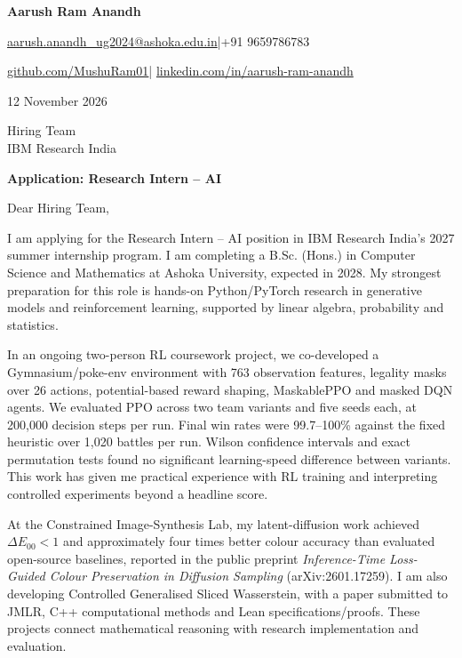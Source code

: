 \documentclass[11pt,a4paper]{article}
\begin{document}
{\LARGE\bfseries Aarush Ram Anandh}\par\vspace{4pt}
\href{mailto:aarush.anandh_ug2024@ashoka.edu.in}{aarush.anandh\_ug2024@ashoka.edu.in}\quad|\quad +91 9659786783\par\vspace{2pt}
\href{https://github.com/MushuRam01}{github.com/MushuRam01}\quad|\quad
\href{https://www.linkedin.com/in/aarush-ram-anandh/}{linkedin.com/in/aarush-ram-anandh}\par
\vspace{20pt}
12 November 2026\par\vspace{12pt}
Hiring Team\\
IBM Research India\par\vspace{12pt}
\textbf{Application: Research Intern -- AI}\par\vspace{14pt}
Dear Hiring Team,\par\vspace{10pt}
I am applying for the Research Intern -- AI position in IBM Research India's 2027 summer internship program. I am completing a B.Sc. (Hons.) in Computer Science and Mathematics at Ashoka University, expected in 2028. My strongest preparation for this role is hands-on Python/PyTorch research in generative models and reinforcement learning, supported by linear algebra, probability and statistics.\par\vspace{10pt}
In an ongoing two-person RL coursework project, we co-developed a Gymnasium/poke-env environment with 763 observation features, legality masks over 26 actions, potential-based reward shaping, MaskablePPO and masked DQN agents. We evaluated PPO across two team variants and five seeds each, at 200,000 decision steps per run. Final win rates were 99.7--100\% against the fixed heuristic over 1,020 battles per run. Wilson confidence intervals and exact permutation tests found no significant learning-speed difference between variants. This work has given me practical experience with RL training and interpreting controlled experiments beyond a headline score.\par\vspace{10pt}
At the Constrained Image-Synthesis Lab, my latent-diffusion work achieved $\Delta E_{00}<1$ and approximately four times better colour accuracy than evaluated open-source baselines, reported in the public preprint \textit{Inference-Time Loss-Guided Colour Preservation in Diffusion Sampling} (arXiv:2601.17259). I am also developing Controlled Generalised Sliced Wasserstein, with a paper submitted to JMLR, C++ computational methods and Lean specifications/proofs. These projects connect mathematical reasoning with research implementation and evaluation.\par\vspace{10pt}
\end{document}
